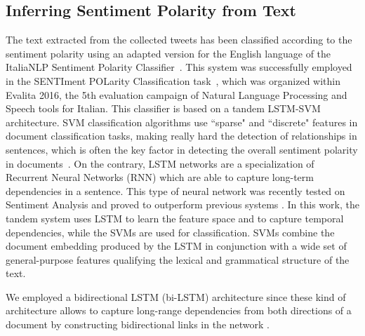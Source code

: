
\subsection{Inferring Sentiment Polarity from Text}
\label{sec:vsa:method}

The text extracted from the collected tweets has been classified according to the sentiment polarity using an adapted version for the English language of the ItaliaNLP Sentiment Polarity Classifier~\cite{cimino2016tandem}.
This system was successfully employed in the SENTIment POLarity Classification task~\cite{barbieri2016overview}, which was organized within Evalita 2016, the 5th evaluation campaign of Natural Language Processing and Speech tools for Italian.
This classifier is based on a tandem LSTM-SVM architecture.
SVM classification algorithms use ``sparse" and ``discrete" features in document classification tasks, making really hard the detection of relationships in sentences, which is often the key factor in detecting the overall sentiment polarity in documents~\cite{tang2015document}.
On the contrary, LSTM networks are a specialization of Recurrent Neural Networks (RNN) which are able to capture long-term dependencies in a sentence. This type of neural network was recently tested on Sentiment Analysis and proved to outperform previous systems \cite{nakov2016semeval}.
In this work, the tandem system uses LSTM to  learn  the  feature  space and to  capture temporal dependencies, while the SVMs are used for classification.
SVMs combine the document embedding produced  by  the  LSTM  in conjunction with  a  wide  set of general-purpose features qualifying the lexical  and grammatical  structure  of  the text.

We  employed  a  bidirectional  LSTM (bi-LSTM) architecture since these kind of architecture allows to capture long-range dependencies from both directions
of a document by constructing bidirectional links in the network \cite{schuster1997bidirectional}.

